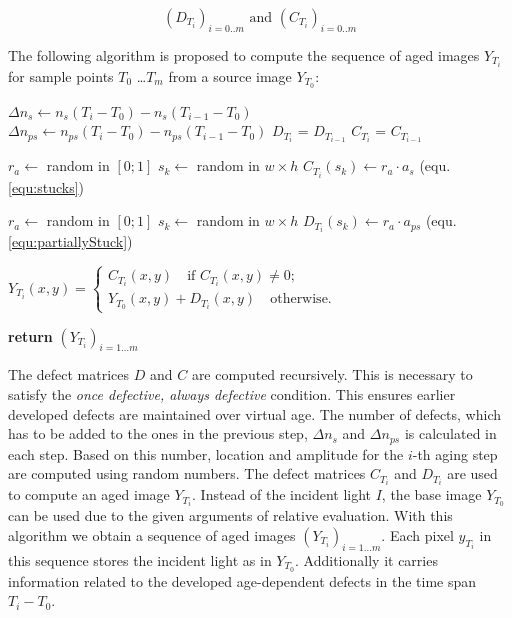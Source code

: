 \documentclass[10pt,twocolumn,letterpaper]{article}
\begin{document}
\begin{equation}
(D_{T_i})_{i=0..m} \text{ and } (C_{T_i})_{i=0..m}
\end{equation}

The following algorithm is proposed to compute the sequence of aged images $Y_{T_i}$ for sample points $T_0$ \dots $T_m$ from a source image $Y_{T_0}$:

\vspace{2mm}
\begin{algorithmic}[1]


\State $\Delta n_s\gets n_s(T_i - T_0) - n_s(T_{i-1} - T_0) $ 
\State $\Delta n_{ps}\gets n_{ps}(T_i - T_0) - n_{ps}(T_{i-1} - T_0) $
\State $D_{T_i}$ = $D_{T_{i-1}}$
\State $C_{T_i}$ = $C_{T_{i-1}}$

    \State $r_a \gets$ random in $[0;1]$
    \State $s_k \gets$ random in $w \times h$
    \State $C_{T_{i}}(s_k) \gets r_a \cdot a_s$ (equ. \ref{equ:stucks})
  \EndFor
  
    \State $r_a \gets$ random in $[0;1]$ 
    \State $s_k \gets$ random in $w \times h$
    \State $D_{T_i}({s_k}) \gets r_a \cdot a_{ps}$ (equ. \ref{equ:partiallyStuck})
  \EndFor
  
  
  $Y_{T_{i}}(x,y) = \begin{cases}
  C_{T_i}(x,y) \quad \text{if $C_{T_i}(x,y) \neq 0$}; \\
  Y_{T_{0}}(x,y) +D_{T_i}(x,y)  \quad \text{otherwise}.
  \end{cases}$
  
\EndFor
\State \textbf{return} $(Y_{T_i})_{i=1 \dots m}$
\EndProcedure
\end{algorithmic}

\vspace{5mm}


The defect matrices $D$ and $C$ are computed recursively. This is necessary to satisfy the \emph{once defective, always defective} condition. This ensures earlier developed defects are maintained over virtual age. The number of defects, which has to be added to the ones in the previous step, $\Delta n_s$ and $\Delta n_{ps}$ is calculated in each step. Based on this number, location and amplitude for the $i$-th aging step are computed using random numbers. The defect matrices $C_{T_i}$ and $D_{T_i}$ are used to compute an aged image $Y_{T_i}$. Instead of the incident light $I$, the base image $Y_{T_0}$ can be used due to the given arguments of relative evaluation. With this algorithm we obtain a sequence  of aged images $(Y_{T_i})_{i=1 \dots m}$. Each pixel $y_{T_i}$ in this sequence stores the incident light as in $Y_{T_0}$. Additionally it carries information related to the developed age-dependent defects in the time span $T_i-T_0$.
 
\end{document}
